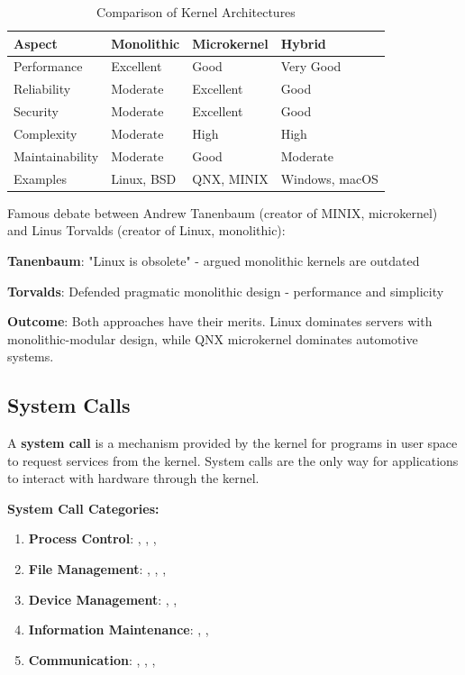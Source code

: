\begin{table}[htbp]
    \centering
    \caption{Comparison of Kernel Architectures}
    \label{tab:kernel-comparison}
    \begin{tabular}{@{}llll@{}}
        \toprule
        \textbf{Aspect} & \textbf{Monolithic} & \textbf{Microkernel} & \textbf{Hybrid} \\
        \midrule
        Performance & Excellent & Good & Very Good \\
        Reliability & Moderate & Excellent & Good \\
        Security & Moderate & Excellent & Good \\
        Complexity & Moderate & High & High \\
        Maintainability & Moderate & Good & Moderate \\
        Examples & Linux, BSD & QNX, MINIX & Windows, macOS \\
        \bottomrule
    \end{tabular}
\end{table}

\begin{examplebox}
Famous debate between Andrew Tanenbaum (creator of MINIX, microkernel) and Linus Torvalds (creator of Linux, monolithic):

\textbf{Tanenbaum}: "Linux is obsolete" - argued monolithic kernels are outdated

\textbf{Torvalds}: Defended pragmatic monolithic design - performance and simplicity

\textbf{Outcome}: Both approaches have their merits. Linux dominates servers with monolithic-modular design, while QNX microkernel dominates automotive systems.
\end{examplebox}

\subsection{System Calls}

A \textbf{system call} is a mechanism provided by the kernel for programs in user space to request services from the kernel. System calls are the only way for applications to interact with hardware through the kernel.

\textbf{System Call Categories:}
\begin{enumerate}
    \item \textbf{Process Control}: , , , 
    \item \textbf{File Management}: , , , 
    \item \textbf{Device Management}: , , 
    \item \textbf{Information Maintenance}: , , 
    \item \textbf{Communication}: , , , 
\end{enumerate}

